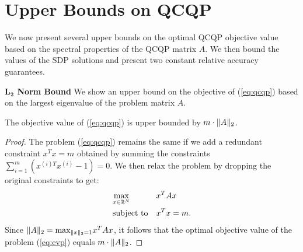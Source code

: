 \section{Upper Bounds on QCQP}\label{chap:relaxations:upperbounds}
We now present several upper bounds on the optimal QCQP objective
value based on the spectral properties of the QCQP matrix $A$. We then bound the
values of the SDP solutions and present two constant relative accuracy
guarantees.

\noindent\textbf{$\mathbf{L_2}$ Norm Bound}
We show an  upper bound on the objective of (\ref{eq:qcqp}) based on the largest eigenvalue
of the problem matrix $A$.

\begin{proposition}
The objective value of (\ref{eq:qcqp}) is upper bounded by $m \cdot \lVert A\rVert_2$.
\end{proposition}
\begin{proof}
The problem (\ref{eq:qcqp}) remains the same if we add a redundant constraint $x^T x = m$
obtained by summing the constraints $\sum_{i= 1}^{m} \left(x^{(i)T}x^{(i)} - 1\right) = 0$.
We then relax the problem by dropping the original constraints to get:
\begin{equation}\label{eq:evp}
\begin{aligned}
& \underset{x \in \mathbb{R}^{N}}{\text{max}}
& & x^T A x\\
& \text{subject to}
& &x^{T} x = m.
\end{aligned}
\end{equation}
Since $\lVert A\rVert_2 = \text{max}_{\lVert x\rVert_2 = 1} x^T A x$, it follows that the optimal
objective value of the problem (\ref{eq:evp}) equals $m \cdot \lVert A\rVert_2 $.
\end{proof}

